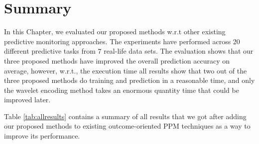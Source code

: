 


\section{Summary}
In this Chapter, we evaluated our proposed methods w.r.t other existing predictive monitoring approaches. The experiments have performed across 20 different predictive tasks from $7$ real-life data sets. The evaluation shows that our three proposed methods have improved the overall prediction accuracy on average,  however, w.r.t., the execution time all results show that two out of the three proposed methods do training and prediction in a reasonable time, and only the wavelet encoding method takes an enormous quantity time that could be improved later. 



Table \ref{tab:allresults} contains a summary of all results that we got after adding our proposed methods to existing outcome-oriented PPM techniques as a way to improve its performance.


